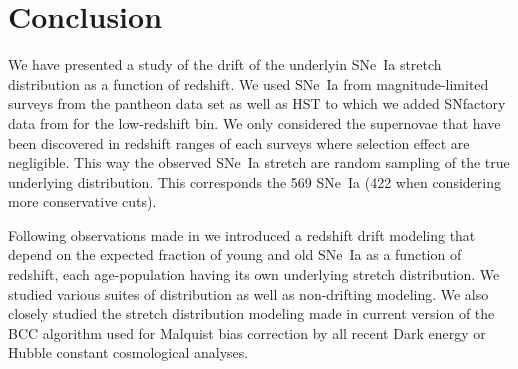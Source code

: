 \documentclass[]{aa} %
\begin{document}
\section{Conclusion}
\label{sec:ccl}
We have presented a study of the drift of the underlyin SNe~Ia stretch
distribution as a function of redshift.  We used SNe~Ia from magnitude-limited
surveys from the pantheon data set \citep[][SDSS, PS1 and SNLS]{scolnic2018a} as
well as HST to which we added SNfactory data from \cite{rigault2018} for the
low-redshift bin. We only considered the supernovae that have been discovered
in redshift ranges of each surveys where selection effect are negligible. This
way the observed SNe~Ia stretch are random sampling of the true underlying
distribution. This corresponds the 569 SNe~Ia (422 when considering more
conservative cuts).

Following observations made in \cite{rigault2018} we introduced a redshift drift
modeling that depend on the expected fraction of young and old SNe~Ia as a
function of redshift, each age-population having its own underlying stretch
distribution. We studied various suites of distribution as well as non-drifting
modeling. We also closely studied the stretch distribution modeling made in
current version of the BCC algorithm used for Malquist bias correction by all
recent Dark energy or Hubble constant cosmological analyses. 
\end{document}

